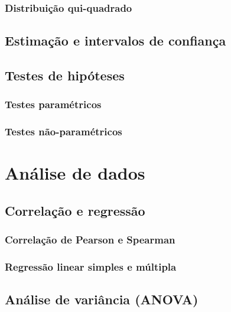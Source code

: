 \documentclass[
]{book}
\begin{document}
\subsection{Distribuição qui-quadrado}\label{distribuiuxe7uxe3o-qui-quadrado}

\section{Estimação e intervalos de confiança}\label{estimauxe7uxe3o-e-intervalos-de-confianuxe7a}

\section{Testes de hipóteses}\label{testes-de-hipuxf3teses}

\subsection{Testes paramétricos}\label{testes-paramuxe9tricos}

\subsection{Testes não-paramétricos}\label{testes-nuxe3o-paramuxe9tricos}

\chapter{Análise de dados}\label{anuxe1lise-de-dados}

\section{Correlação e regressão}\label{correlauxe7uxe3o-e-regressuxe3o}

\subsection{Correlação de Pearson e Spearman}\label{correlauxe7uxe3o-de-pearson-e-spearman}

\subsection{Regressão linear simples e múltipla}\label{regressuxe3o-linear-simples-e-muxfaltipla}

\section{Análise de variância (ANOVA)}\label{anuxe1lise-de-variuxe2ncia-anova}
\end{document}
